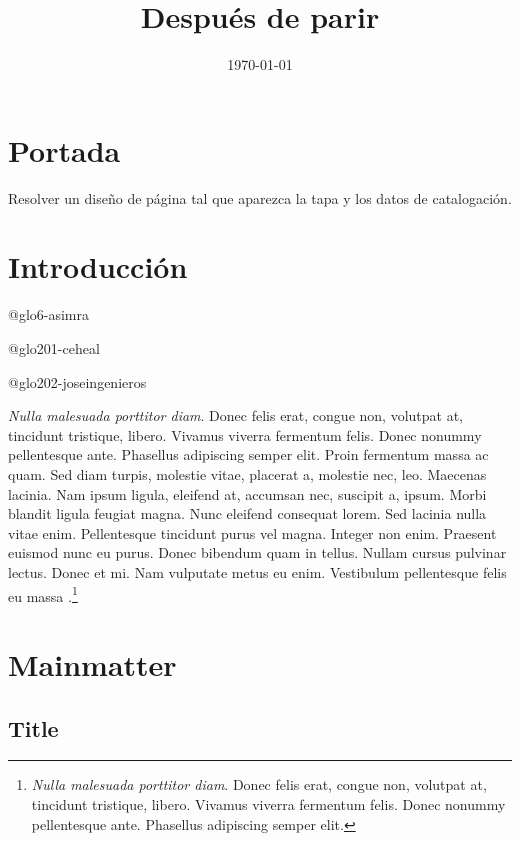 \documentclass{book}
\title{Después de parir}
\date{\today}
\begin{document}
\frontmatter

\maketitle

\tableofcontents

\chapter{Portada}

Resolver un diseño de página tal que aparezca la tapa y los datos de catalogación.

\chapter{Introducción}

\lipsum[1]

\gls{@glo6-asimra}

\gls{@glo201-ceheal}

\gls{@glo202-joseingenieros}

\emph{Nulla malesuada porttitor diam}. Donec felis erat, congue non, volutpat at, tincidunt tristique, libero. Vivamus viverra fermentum felis. Donec nonummy pellentesque ante. Phasellus adipiscing semper elit. Proin fermentum massa ac quam. Sed diam turpis, molestie vitae, placerat a, molestie nec, leo. Maecenas lacinia. Nam ipsum ligula, eleifend at, accumsan nec, suscipit a, ipsum. Morbi blandit ligula feugiat magna. Nunc eleifend consequat lorem. Sed lacinia nulla vitae enim. Pellentesque tincidunt purus vel magna. Integer non enim. Praesent euismod nunc eu purus. Donec bibendum quam in tellus. Nullam cursus pulvinar lectus. Donec et mi. Nam vulputate metus eu enim. Vestibulum pellentesque felis eu massa \parencite{@940-SHUMWAY1999}.\footnote{\emph{Nulla malesuada porttitor diam}. Donec felis erat, congue non, volutpat at, tincidunt tristique, libero. Vivamus viverra fermentum felis. Donec nonummy pellentesque ante. Phasellus adipiscing semper elit.}

\lipsum[1]

\mainmatter

\chapter{Mainmatter}
\label{mychapter}

\lipsum[1]

\section{Title}
\end{document}
